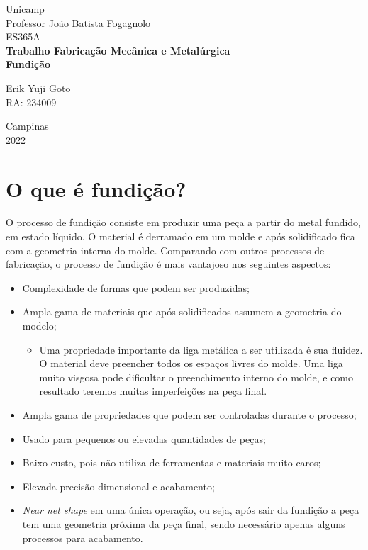 \documentclass[a4paper, 12pt]{article}
\begin{document}
%
\begin{titlepage} %
	\begin{center} %
		{\large Unicamp}\\[0.4cm] %
		{\large Professor João Batista Fogagnolo}\\
		{\large ES365A}\\[3.2cm]
		{\bf \huge Trabalho Fabricação Mecânica e Metalúrgica}\\[0.2cm] 
		{\bf \large Fundição}\\[4.9cm]
	\end{center} %
	{\large Erik Yuji Goto}\\ %
	RA: 234009\\[10cm]
	\begin{center}
	
		{\large Campinas}\\[0.2cm]
		{\large 2022}
	\end{center}
\end{titlepage} %


\tableofcontents
\newpage

\section{O que é fundição?}
	O processo de fundição consiste em produzir uma peça a partir do metal fundido, em estado líquido. O material é derramado em um molde e após solidificado fica com a geometria interna do molde.
	Comparando com outros processos de fabricação, o processo de fundição é mais vantajoso nos seguintes aspectos:
	\begin{itemize}
		\item Complexidade de formas que podem ser produzidas;
		\item Ampla gama de materiais que após solidificados assumem a geometria do modelo;
			\begin{itemize}
				\item Uma propriedade importante da liga metálica a ser utilizada é sua fluidez. O material deve preencher todos os espaços livres do molde. Uma liga muito visgosa pode dificultar o preenchimento interno do molde, e como resultado teremos muitas imperfeições na peça final.
			\end{itemize}
		\item Ampla gama de propriedades que podem ser controladas durante o processo;
		\item Usado para pequenos ou elevadas quantidades de peças;
		\item Baixo custo, pois não utiliza de ferramentas e materiais muito caros;
		\item Elevada precisão dimensional e acabamento;
		\item \textit{Near net shape} em uma única operação, ou seja, após sair da fundição a peça tem uma geometria próxima da peça final, sendo necessário apenas alguns processos para acabamento. 
	\end{itemize}
\end{document}
